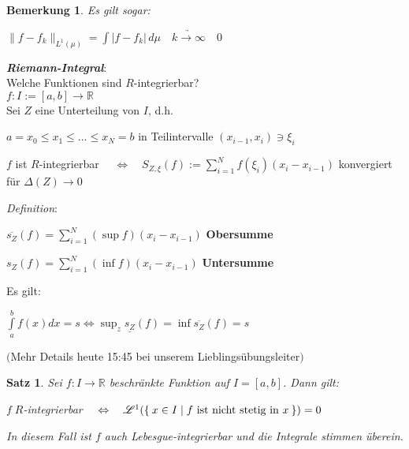 \documentclass[11pt]{memoir}
\theoremstyle{changebreak}
\newtheorem{Bemerkung}{Bemerkung}[chapter]
\newtheorem{Satz}{Satz}[chapter]
\begin{document}
\begin{Bemerkung}
Es gilt sogar: 
\begin{center}
	$\|f - f_k\|_{L^1(\mu)} = \int |f - f_k| \,d\mu \quad \underrightarrow{k \rightarrow \infty} \quad 0$
\end{center}
\end{Bemerkung}

\par\bigskip
\emph{\textbf{Riemann-Integral}}: \\

Welche Funktionen sind $R$-integrierbar? \\
$f: I:=[a, b] \rightarrow \mathbb R$ \\
Sei $Z$ eine Unterteilung von $I$, d.h. 
\begin{center}
	$a=x_0\leq x_1 \leq ... \leq x_N = b$ in Teilintervalle $(x_{i-1}, x_i) \ni \xi_i$ 
\end{center}
\begin{center}
	$f$ ist $R$-integrierbar $\quad \Leftrightarrow \quad S_{Z, \xi} (f) := \sum\limits_{i=1}^N f(\xi_i)(x_i - x_{i-1})$ konvergiert für $\Delta(Z) \rightarrow 0$ 
\end{center}


\emph{Definition}: \\
\begin{center}
	$\overline{s_Z}(f) = \sum\limits_{i=1}^N (\sup f)(x_i  - x_{i-1})$ \quad \textbf{Obersumme} 
\end{center}
\begin{center}
	\underline{$s_Z$}$(f) = \sum\limits_{i=1}^N (\inf f)(x_i - x_{i-1})$ \quad \textbf{Untersumme} 
\end{center}
Es gilt:
\begin{center}
	$\int\limits_a^b f(x) dx = s \Leftrightarrow \sup_z \underline{s_Z}(f) = \inf \overline{s_Z}(f) = s$ 
\end{center}
$($Mehr Details heute 15:45 bei unserem Lieblingsübungsleiter$)$

\begin{Satz}
Sei $f: I \rightarrow \mathbb R$ beschränkte Funktion auf $I = [a, b]$. Dann gilt: 
\begin{center}
	$f \;R$-integrierbar $\quad \Leftrightarrow\quad  \mathscr L^1(\Set{x \in I | f \text{ ist nicht stetig in } x }) = 0$ 
\end{center}
In diesem Fall ist $f$ auch Lebesgue-integrierbar und die Integrale stimmen überein.
\end{Satz}
\end{document}
